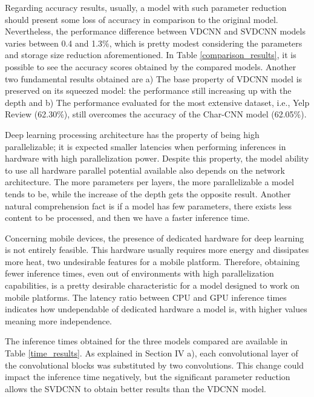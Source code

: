 \documentclass[conference]{IEEEtran}
\begin{document}
Regarding accuracy results, usually, a model with such parameter reduction should present some loss of accuracy in comparison to the original model. Nevertheless, the performance difference between VDCNN and SVDCNN models varies between 0.4 and 1.3\%, which is pretty modest considering the parameters and storage size reduction aforementioned. In Table \ref{comparison_results}, it is possible to see the accuracy scores obtained by the compared models. Another two fundamental results obtained are a) The base property of VDCNN model is preserved on its squeezed model: the performance still increasing up with the depth and b) The performance evaluated for the most extensive dataset, i.e., Yelp Review (62.30\%), still overcomes the accuracy of the Char-CNN model (62.05\%).

Deep learning processing architecture has the property of being high parallelizable; it is expected smaller latencies when performing inferences in hardware with high parallelization power. Despite this property, the model ability to use all hardware parallel potential available also depends on the network architecture. The more parameters per layers, the more parallelizable a model tends to be, while the increase of the depth gets the opposite result. Another natural comprehension fact is if a model has few parameters, there exists less content to be processed, and then we have a faster inference time. 

Concerning mobile devices, the presence of dedicated hardware for deep learning is not entirely feasible. This hardware usually requires more energy and dissipates more heat, two undesirable features for a mobile platform. Therefore, obtaining fewer inference times, even out of environments with high parallelization capabilities, is a pretty desirable characteristic for a model designed to work on mobile platforms. The latency ratio between CPU and GPU inference times indicates how undependable of dedicated hardware a model is, with higher values meaning more independence. 

The inference times obtained for the three models compared are available in Table \ref{time_results}. As explained in Section IV a), each convolutional layer of the convolutional blocks was substituted by two convolutions. This change could impact the inference time negatively, but the significant parameter reduction allows the SVDCNN to obtain better results than the VDCNN model.
\end{document}
